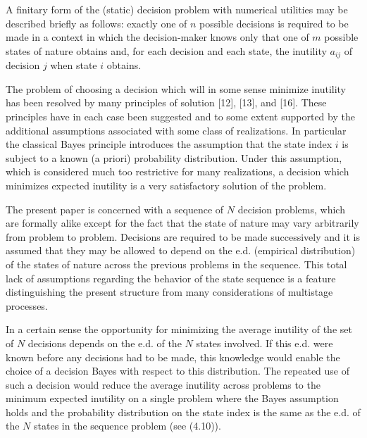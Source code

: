 \documentclass[11pt]{article}
\numberwithin{equation}{section}
\theoremstyle{boldStyle}
\begin{document}
A finitary form of the (static) decision problem with numerical utilities may be described briefly as follows: exactly one of \( n \) possible decisions is 
required to be made in a context in which the decision-maker knows only that one of \( m \) possible states of nature obtains and, 
for each decision and each state, the inutility \( a_{ij} \) of decision \( j \) when state \( i \) obtains.

\medbreak

The problem of choosing a decision which will in some sense minimize inutility has been resolved by many principles of solution [12], [13], and [16]. 
These principles have in each case been suggested and to some extent supported by the additional assumptions associated with some class of realizations. 
In particular the classical Bayes principle introduces the assumption that the state index \( i \) is subject to a known (a priori) probability distribution. 
Under this assumption, which is considered much too restrictive for many realizations, a decision which minimizes expected inutility is a very 
satisfactory solution of the problem.

\medbreak

The present paper is concerned with a sequence of \( N \) decision problems, which are formally alike except for the fact that the state of nature may 
vary arbitrarily from problem to problem. Decisions are required to be made successively and it is assumed that they may be allowed to depend on the e.d.
 (empirical distribution) of the states of nature across the previous problems in the sequence. 
 This total lack of assumptions regarding the behavior of the state sequence is a feature distinguishing the present structure from many 
 considerations of multistage processes.

\medbreak

In a certain sense the opportunity for minimizing the average inutility of the set of \( N \) decisions depends on the e.d. of the \( N \) states involved. 
If this e.d. were known before any decisions had to be made, this knowledge would enable the choice of a decision Bayes with respect to this distribution. 
The repeated use of such a decision would reduce the average inutility across problems to the minimum expected inutility on a single problem where the 
Bayes assumption holds and the probability distribution on the state index is the same as the e.d. of the \( N \) states in the sequence problem (see (4.10)).

\medbreak
\end{document}

